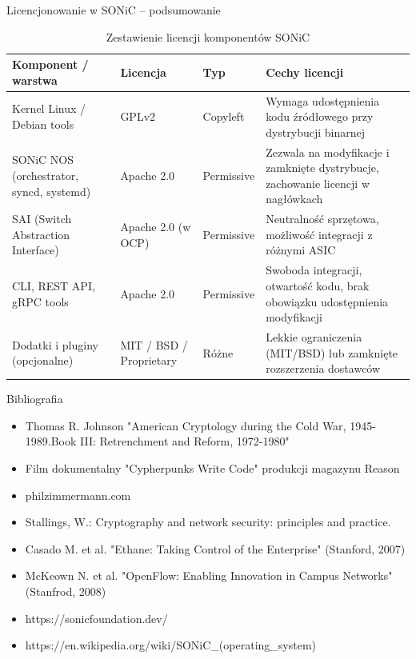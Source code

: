 \documentclass[aspectratio=169]{beamer}
\begin{document}
\begin{frame}{Licencjonowanie w SONiC – podsumowanie}
\begin{table}[h!]
\centering
\footnotesize
\begin{tabular}{|p{3.5cm}|p{2.5cm}|p{2cm}|p{4.5cm}|}
\hline
\textbf{Komponent / warstwa} & \textbf{Licencja} & \textbf{Typ} & \textbf{Cechy licencji} \\
\hline
Kernel Linux / Debian tools & GPLv2 & Copyleft & Wymaga udostępnienia kodu źródłowego przy dystrybucji binarnej \\
\hline
SONiC NOS (orchestrator, syncd, systemd) & Apache 2.0 & Permissive & Zezwala na modyfikacje i zamknięte dystrybucje, zachowanie licencji w nagłówkach \\
\hline
SAI (Switch Abstraction Interface) & Apache 2.0 (w OCP) & Permissive & Neutralność sprzętowa, możliwość integracji z różnymi ASIC \\
\hline
CLI, REST API, gRPC tools & Apache 2.0 & Permissive & Swoboda integracji, otwartość kodu, brak obowiązku udostępnienia modyfikacji \\
\hline
Dodatki i pluginy (opcjonalne) & MIT / BSD / Proprietary & Różne & Lekkie ograniczenia (MIT/BSD) lub zamknięte rozszerzenia dostawców \\
\hline
\end{tabular}
\caption{Zestawienie licencji komponentów SONiC}
\end{table}
\end{frame}


\begin{frame}{Bibliografia}
    \begin{itemize}
        \item Thomas R. Johnson "American Cryptology during the Cold War, 1945-1989.Book III: Retrenchment and Reform, 1972-1980"
        \item Film dokumentalny "Cypherpunks Write Code" produkcji magazynu Reason
        \item philzimmermann.com
        \item Stallings, W.: Cryptography and network security: principles and practice.
        \item Casado M. et al. "Ethane: Taking Control of the Enterprise" (Stanford, 2007)
        \item McKeown N. et al. "OpenFlow: Enabling Innovation in Campus Networks" (Stanfrod, 2008)
        \item https://sonicfoundation.dev/
        \item https://en.wikipedia.org/wiki/SONiC\_(operating\_system)
    \end{itemize}
\end{frame}

\pglastframe

\end{document}
